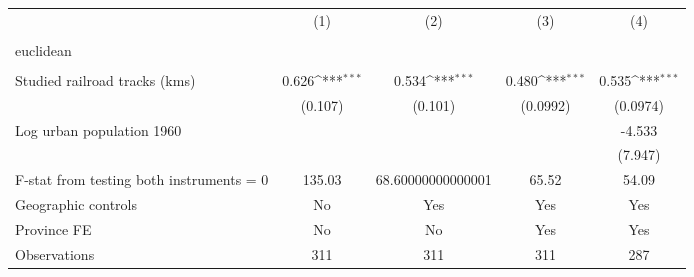 {
\def\sym#1{\ifmmode^{#1}\else\(^{#1}\)\fi}
\begin{tabular}{l*{4}{c}}
\hline\hline
                &\multicolumn{1}{c}{(1)}&\multicolumn{1}{c}{(2)}&\multicolumn{1}{c}{(3)}&\multicolumn{1}{c}{(4)}\\
                &\multicolumn{1}{c}{}&\multicolumn{1}{c}{}&\multicolumn{1}{c}{}&\multicolumn{1}{c}{}\\
\hline
euclidean       &                  &                  &                  &                  \\
                &                  &                  &                  &                  \\
[1em]
Studied railroad tracks (kms)&    0.626\sym{***}&    0.534\sym{***}&    0.480\sym{***}&    0.535\sym{***}\\
                &  (0.107)         &  (0.101)         & (0.0992)         & (0.0974)         \\
[1em]
Log urban population 1960&                  &                  &                  &   -4.533         \\
                &                  &                  &                  &  (7.947)         \\
\hline
F-stat from testing both instruments = 0&   135.03         &68.60000000000001         &    65.52         &    54.09         \\
Geographic controls&       No         &      Yes         &      Yes         &      Yes         \\
Province FE     &       No         &       No         &      Yes         &      Yes         \\
Observations    &      311         &      311         &      311         &      287         \\
\hline\hline
\end{tabular}
}
